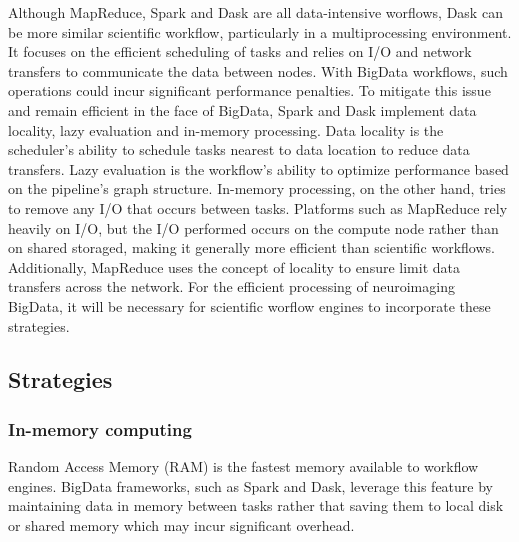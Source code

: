 \documentclass{report}
\newcommand{\weird}[1]{\uwave{#1}}
\begin{document}
            
            Although MapReduce, Spark and Dask are all data-intensive worflows,
            Dask can be more similar \weird{to that of} scientific workflow, 
            particularly in a multiprocessing environment. It focuses on the 
            efficient 
            scheduling of tasks and relies on I/O and network transfers to
            communicate the data between nodes. With BigData workflows, such
            operations could incur significant performance penalties. 
            To mitigate this issue and remain efficient in the face of
            BigData, Spark and Dask implement data locality, lazy evaluation 
            and in-memory processing. Data locality is the scheduler's ability
            to schedule tasks nearest to data location to reduce data transfers.
            Lazy evaluation is the workflow's ability to optimize performance
            based on the pipeline's graph structure. In-memory processing, on 
            the other hand, tries to remove any I/O that occurs between tasks. 
            Platforms such as MapReduce rely heavily 
            on I/O, but the 
            I/O performed occurs on the compute node rather than on 
            shared storaged, making it generally more efficient than scientific
            workflows. Additionally, MapReduce uses the concept of 
            locality to ensure limit data transfers across the network.
            For the efficient processing of neuroimaging BigData, it will be
            necessary for scientific worflow engines to incorporate these 
            strategies.
        

            \subsection{Strategies}
                \subsubsection{In-memory computing}
                    Random Access Memory (RAM) is the fastest memory available
                    to workflow engines. BigData frameworks, such as Spark and 
                    Dask, leverage this feature by maintaining data in memory 
                    between tasks rather that saving them to local disk or 
                    shared memory which may incur significant overhead.
\end{document}
